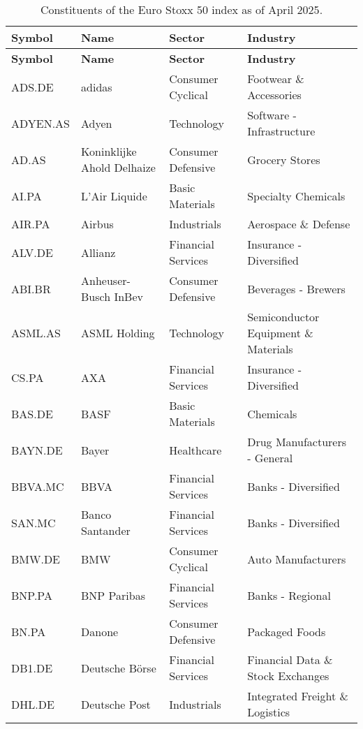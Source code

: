 \begin{longtable}{|p{2cm}|p{3cm}|p{4cm}|p{4cm}|}
\caption{Constituents of the Euro Stoxx 50 index as of April 2025\cite{WikipediaEuroStoxx50}.}
\label{tab:eurostoxx50constituents}
\\ 
\hline
\textbf{Symbol} & \textbf{Name} & \textbf{Sector} & \textbf{Industry} \\ \midrule
\endfirsthead

\hline
\textbf{Symbol} & \textbf{Name} & \textbf{Sector} & \textbf{Industry} \\ \midrule
\endhead

\endfoot

\hline
ADS.DE & adidas & Consumer Cyclical & Footwear \& Accessories \\ \hline
ADYEN.AS & Adyen & Technology & Software - Infrastructure \\ \hline
AD.AS & Koninklijke Ahold Delhaize & Consumer Defensive & Grocery Stores \\ \hline
AI.PA & L'Air Liquide & Basic Materials & Specialty Chemicals \\ \hline
AIR.PA & Airbus & Industrials & Aerospace \& Defense \\ \hline
ALV.DE & Allianz & Financial Services & Insurance - Diversified \\ \hline
ABI.BR & Anheuser-Busch InBev & Consumer Defensive & Beverages - Brewers \\ \hline
ASML.AS & ASML Holding & Technology & Semiconductor Equipment \& Materials \\ \hline
CS.PA & AXA & Financial Services & Insurance - Diversified \\ \hline
BAS.DE & BASF & Basic Materials & Chemicals \\ \hline
BAYN.DE & Bayer & Healthcare & Drug Manufacturers - General \\ \hline
BBVA.MC & BBVA & Financial Services & Banks - Diversified \\ \hline
SAN.MC & Banco Santander & Financial Services & Banks - Diversified \\ \hline
BMW.DE & BMW & Consumer Cyclical & Auto Manufacturers \\ \hline
BNP.PA & BNP Paribas & Financial Services & Banks - Regional \\ \hline
BN.PA & Danone & Consumer Defensive & Packaged Foods \\ \hline
DB1.DE & Deutsche Börse & Financial Services & Financial Data \& Stock Exchanges \\ \hline
DHL.DE & Deutsche Post & Industrials & Integrated Freight \& Logistics \\ \hline

\end{longtable}
